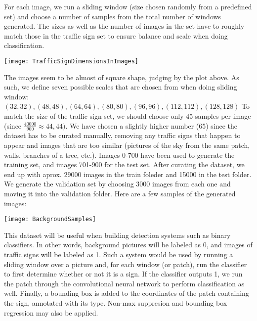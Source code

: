 For each image, we run a sliding window (size chosen randomly from a predefined set) and choose a number of samples from the total number of windows generated. The sizes as well as the number of images in the set have to roughly match those in the traffic sign set to ensure balance and scale when doing classification.
\begin{center}
\texttt{[image: TrafficSignDimensionsInImages]}
\end{center}
The images seem to be almost of square shape, judging by the plot above. As such, we define seven possible scales that are chosen from when doing sliding window:
$(32,32), (48,48), (64,64), (80,80), (96,96), (112,112), (128,128)$
To match the size of the traffic sign set, we should choose only 45 samples per image (since $\frac{40000}{900}\approx44,44)$. We have chosen a slightly higher number (65) since the dataset has to be curated manually, removing any traffic signs that happen to appear and images that are too similar (pictures of the sky from the same patch, walls, branches of a tree, etc.).
Images 0-700 have been used to generate the training set, and images 701-900 for the test set. After curating the dataset, we end up with aprox. 29000 images in the train foleder and 15000 in the test folder. We generate the validation set by choosing 3000 images from each one and moving it into the validation folder. Here are a few samples of the generated images:\\
\begin{center}
\texttt{[image: BackgroundSamples]}
\end{center}


This dataset will be useful when building detection systems such as binary classifiers. In other words, background pictures will be labeled as 0, and images of traffic signs will be labeled as 1. Such a system would be used by running a sliding window over a picture and, for each window (or patch), run the classifier to first determine whether or not it is a sign. If the classifier outputs 1, we run the patch through the convolutional neural network to perform classification as well. Finally, a bounding box is added to the coordinates of the patch containing the sign, annotated with its type. Non-max suppresion and bounding box regression may also be applied.